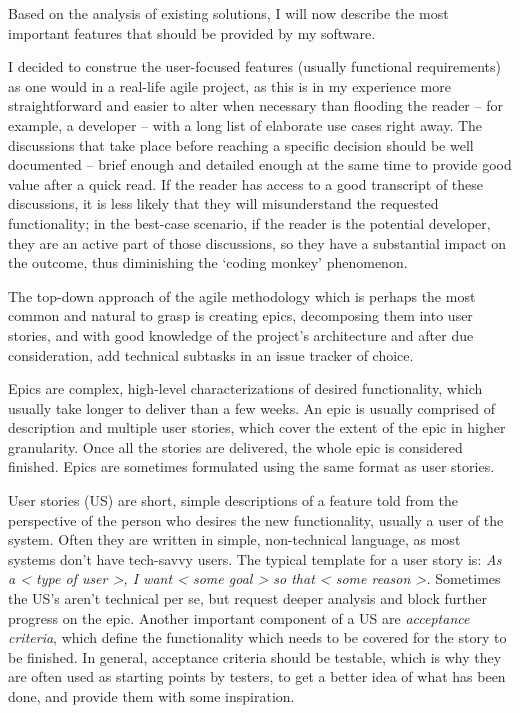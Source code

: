 \linebreak
Based on the analysis of existing solutions, I will now describe the most important features that should be provided by my software.

I decided to construe the user-focused features (usually functional requirements) as one would in a real-life agile project, as this is in my experience more straightforward and easier to alter when necessary than flooding the reader -- for example, a developer -- with a long list of elaborate use cases right away.
The discussions that take place before reaching a specific decision should be well documented -- brief enough and detailed enough at the same time to provide good value after a quick read.
If the reader has access to a good transcript of these discussions, it is less likely that they will misunderstand the requested functionality;
in the best-case scenario, if the reader is the potential developer, they are an active part of those discussions, so they have a substantial impact on the outcome, thus diminishing the `coding monkey' phenomenon.

The top-down approach of the agile methodology which is perhaps the most common and natural to grasp is creating epics, decomposing them into user stories,
and with good knowledge of the project's architecture and after due consideration, add technical subtasks in an issue tracker of choice.

Epics are complex, high-level characterizations of desired functionality, which usually take longer to deliver than a few weeks.
An epic is usually comprised of description and multiple user stories, which cover the extent of the epic in higher granularity.
Once all the stories are delivered, the whole epic is considered finished.
Epics are sometimes formulated using the same format as user stories.

User stories (US) are short, simple descriptions of a feature told from the perspective of the person who desires the new functionality, usually a user of the system.\cite{user-story-definition}
Often they are written in simple, non-technical language, as most systems don't have tech-savvy users.
The typical template for a user story is:
\textit{As a < type of user >, I want < some goal > so that < some reason >.}\cite{user-story-definition}
Sometimes the US's aren't technical per se, but request deeper analysis and block further progress on the epic.
Another important component of a US are \textit{acceptance criteria}, which define the functionality which needs to be covered for the story to be finished.
In general, acceptance criteria should be testable, which is why they are often used as starting points by testers, to get a better idea of what has been done, and provide them with some inspiration.

